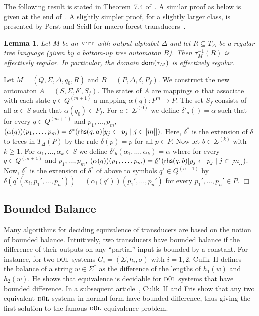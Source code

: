 \documentclass[copyright,creativecommons]{eptcs}
\newtheorem{lemma}{Lemma}
\newcommand{\eop}{\hspace*{\fill}$\Box$}
\newenvironment{proof}{{\it Proof.}\quad}{\eop\vspace*{4mm}}
\newcommand{\dom}[1]{{\sf dom}(#1)}
\newcommand{\mtt}{\textsc{mtt}}
\newcommand{\dol}{\textsc{d0l}}
\def\rhs{{\sf rhs}}
\begin{document}
The following result is stated in Theorem~7.4 of~\cite{DBLP:journals/jcss/EngelfrietV85}.
A similar proof as below is given at the end of~\cite{DBLP:journals/acta/EngelfrietM03}.
A slightly simpler proof, for a slightly larger class, is presented
by Perst and Seidl for macro forest transducers~\cite{DBLP:journals/ipl/PerstS04}.

\begin{lemma}\rm\label{lm:inv}
Let $M$ be an $\mtt$ with output alphabet $\Delta$ and let
$R\subseteq T_\Delta$ be a regular tree language (given by a
bottom-up tree automaton $B$). Then $\tau_M^{-1}(R)$ is effectively regular.
In particular, the domain $\dom{\tau_M}$ is effectively regular.
\end{lemma}
\begin{proof}
Let $M=(Q,\Sigma,\Delta,q_0,R)$ and $B=(P,\Delta,\delta,P_f)$.
We construct the new automaton $A=(S,\Sigma,\delta',S_f)$.
The states of $A$ are mappings $\alpha$ that associate with 
each state $q\in Q^{(m+1)}$ a mapping $\alpha(q): P^m\to P$. 
The set $S_f$ consists of all $\alpha\in S$ such that $\alpha(q_0)\in P_f$.
For $a\in\Sigma^{(0)}$ we define
$\delta'_a()=\alpha$ such that 
for every $q\in Q^{(m+1)}$ and $p_1,\dots,p_m$, 
$(\alpha(q))(p_1,\dots,p_m) = \delta^*(\rhs(q,a)[y_j\leftarrow p_j\mid j\in[m]])$.
Here, $\delta^*$ is the extension of $\delta$ to trees in $T_\Delta(P)$
by the rule $\delta(p)=p$ for all $p\in P$.
Now let $b\in\Sigma^{(k)}$ with $k\geq 1$.
For $\alpha_1,\dots,\alpha_k\in S$ we define
$\delta'_b(\alpha_1,\dots,\alpha_k)=\alpha$ where
for every $q\in Q^{(m+1)}$ and $p_1,\dots,p_m$, 
$(\alpha(q))(p_1,\dots,p_m) = \underline{\delta}^*(\rhs(q,b)[y_j\leftarrow p_j\mid j\in[m]])$.
Now, $\underline{\delta}^*$ is the extension of $\delta^*$ of above 
to symbols $q'\in Q^{(n+1)}$ by 
$\delta(q'(x_i,p_1',\dots,p_n'))=(\alpha_i(q'))(p_1',\dots,p_n')$ for
every $p_1',\dots,p_n'\in P$.
\end{proof}

\subsection{Bounded Balance}

Many algorithms for deciding equivalence of transducers are based
on the notion of bounded balance. 
Intuitively, two transducers have bounded balance if 
the difference of their outputs on any ``partial''
input is bounded by a constant.
For instance, for two $\dol$ systems $G_i=(\Sigma,h_i,\sigma)$ with $i=1,2$,
Culik~II defines~\cite{DBLP:journals/tcs/Culik76} the balance of a string $w\in\Sigma^*$ as the
difference of the lengths of $h_1(w)$ and $h_2(w)$. He shows that
equivalence is decidable for $\dol$ systems that have bounded difference.
In a subsequent article~\cite{DBLP:journals/iandc/CulikF77}, 
Culik~II and Fris show that any two equivalent $\dol$ systems
in normal form have bounded difference, thus giving the first solution to the
famous $\dol$ equivalence problem.
\end{document}
